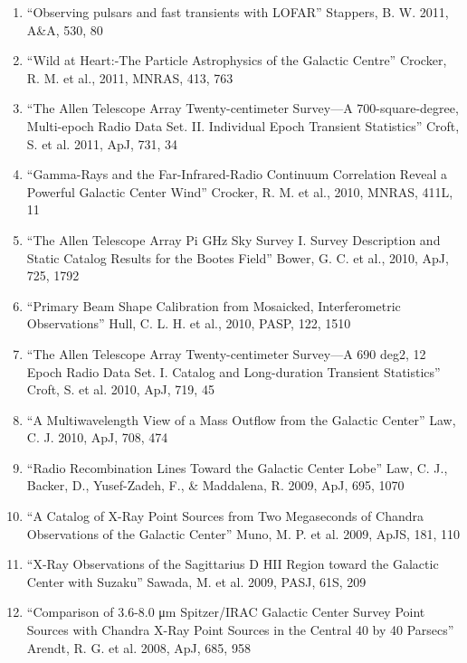 \documentclass[12pt]{article}
\begin{document}
\begin{enumerate}
\item ``Observing pulsars and fast transients with LOFAR'' Stappers, B. W. 2011, A\&A, 530, 80

\item ``Wild at Heart:-The Particle Astrophysics of the Galactic Centre'' Crocker, R. M. et al., 2011, MNRAS, 413, 763

\item ``The Allen Telescope Array Twenty-centimeter Survey—A 700-square-degree, Multi-epoch Radio Data Set. II. Individual Epoch Transient Statistics'' Croft, S. et al. 2011, ApJ, 731, 34

\item ``Gamma-Rays and the Far-Infrared-Radio Continuum Correlation Reveal a Powerful Galactic Center Wind'' Crocker, R. M. et al., 2010, MNRAS, 411L, 11

\item ``The Allen Telescope Array Pi GHz Sky Survey I. Survey Description and Static Catalog Results for the Bootes Field'' Bower, G. C. et al., 2010, ApJ, 725, 1792  

\item ``Primary Beam Shape Calibration from Mosaicked, Interferometric Observations'' Hull, C. L. H. et al., 2010, PASP, 122, 1510

\item ``The Allen Telescope Array Twenty-centimeter Survey—A 690 deg2, 12 Epoch Radio Data Set. I. Catalog and Long-duration Transient Statistics'' Croft, S. et al. 2010, ApJ, 719, 45

\item ``A Multiwavelength View of a Mass Outflow from the Galactic Center'' Law, C. J. 2010, ApJ, 708, 474

\item ``Radio Recombination Lines Toward the Galactic Center Lobe'' Law, C. J., Backer, D., Yusef-Zadeh, F., \& Maddalena, R. 2009, ApJ, 695, 1070

\item ``A Catalog of X-Ray Point Sources from Two Megaseconds of Chandra Observations of the Galactic Center'' Muno, M. P. et al. 2009, ApJS, 181, 110

\item ``X-Ray Observations of the Sagittarius D HII Region toward the Galactic Center with Suzaku'' Sawada, M. et al. 2009, PASJ, 61S, 209

\item ``Comparison of 3.6-8.0 μm Spitzer/IRAC Galactic Center Survey Point Sources with Chandra X-Ray Point Sources in the Central 40 by 40 Parsecs'' Arendt, R. G. et al. 2008, ApJ, 685, 958


\end{enumerate}
\end{document}
